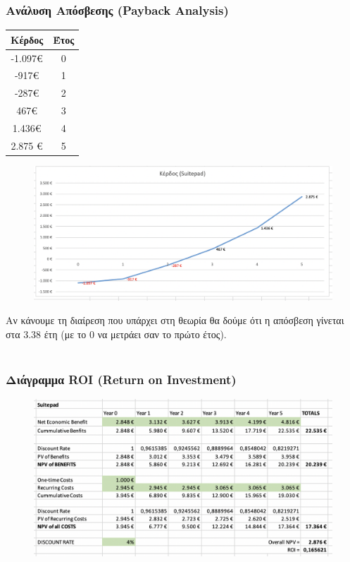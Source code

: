 \subsubsection{Ανάλυση Απόσβεσης (Payback Analysis)}
\begin{table}[H]
	\begin{tabular}{|c|c|}
		\hline
		Κέρδος                        & Έτος \\ \hline
		{\color[HTML]{FE0000} -1.097€} & 0    \\ \hline
		{\color[HTML]{FE0000} -917€} & 1    \\ \hline
		{\color[HTML]{FE0000} -287€} & 2    \\ \hline
		467€                           & 3    \\ \hline
		1.436€                         & 4    \\ \hline
		2.875 €                       & 5    \\ \hline
	\end{tabular}
\end{table}

\begin{figure}[H]
	\centering
	\includegraphics[width=1\textwidth]{Images/4.2.2}
\end{figure}

\noindent
Αν κάνουμε τη διαίρεση που υπάρχει στη θεωρία θα δούμε ότι η απόσβεση γίνεται στα 
3.38 έτη (με το 0 να μετράει σαν το πρώτο έτος). \\ \\

\subsubsection{Διάγραμμα ROI (Return on Investment)}
\begin{figure}[H]
	\centering
	\includegraphics[width=1\textwidth]{Images/4.2.3}
\end{figure}
\clearpage

